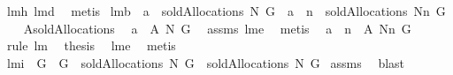 \begin{isabellebody}
\ lm{}{}h\ lm{}{}d\ \isamarkupfalse%
\ metis%
\endisatagproof
{\isafoldproof}%
%
\isadelimproof
%
\endisadelimproof
\isanewline
\isanewline
{}\isamarkupfalse%
\ lm{}{}b{\isacharcolon}\ \ {\isachardoublequoteopen}a\ {\isasymin}\ soldAllocations\ N\ G{\isachardoublequoteclose}\ \ {\isachardoublequoteopen}a\ {\isacharminus}{\isacharminus}\ n\ {\isasymin}\ soldAllocations\ {\isacharparenleft}N{\isacharminus}{\isacharbraceleft}n{\isacharbraceright}{\isacharparenright}\ G{\isachardoublequoteclose}\isanewline
%
\isadelimproof
\isanewline
%
\endisadelimproof
%
\isatagproof
{}\isamarkupfalse%
\ {\isacharminus}\ \isanewline
{}\isamarkupfalse%
\ {\isacharquery}A{\isacharprime}{\isacharequal}soldAllocations{\isacharprime}{\isacharprime}{\isacharprime}\ \isamarkupfalse%
\ {\isachardoublequoteopen}a\ {\isasymin}\ {\isacharquery}A{\isacharprime}\ N\ G{\isachardoublequoteclose}\ \isamarkupfalse%
\ assms\ lm{}{}e\ \isamarkupfalse%
\ metis\ \isamarkupfalse%
\isanewline
{}\isamarkupfalse%
\ {\isachardoublequoteopen}a\ {\isacharminus}{\isacharminus}\ n\ {\isasymin}\ {\isacharquery}A{\isacharprime}\ {\isacharparenleft}N{\isacharminus}{\isacharbraceleft}n{\isacharbraceright}{\isacharparenright}\ G{\isachardoublequoteclose}\ \isamarkupfalse%
\ {\isacharparenleft}rule\ lm{}{}{\isacharparenright}\ \isamarkupfalse%
\ {\isacharquery}thesis\ \isamarkupfalse%
\ lm{}{}e\ \isamarkupfalse%
\ metis\ \isanewline
{}\isamarkupfalse%
%
\endisatagproof
{\isafoldproof}%
%
\isadelimproof
\isanewline
%
\endisadelimproof
\isanewline
{}\isamarkupfalse%
\ lm{}{}i{\isacharcolon}\ \ {\isachardoublequoteopen}G{}\ {\isasymsubseteq}\ G{}{\isachardoublequoteclose}\ \ {\isachardoublequoteopen}soldAllocations{\isacharprime}{\isacharprime}{\isacharprime}\ N\ G{}\ {\isasymsubseteq}\ soldAllocations{\isacharprime}{\isacharprime}{\isacharprime}\ N\ G{}{\isachardoublequoteclose}\isanewline
%
\isadelimproof
%
\endisadelimproof
%
\isatagproof
{}\isamarkupfalse%
\ assms\ \isamarkupfalse%
\ blast%
\endisatagproof
{\isafoldproof}%
%
\isadelimproof
\isanewline

\end{isabellebody}
